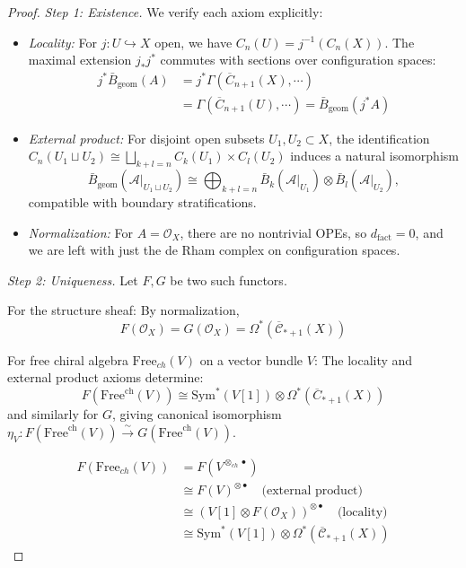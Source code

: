 \begin{proof}
\emph{Step 1: Existence.} We verify each axiom explicitly:
\begin{itemize}
\item \emph{Locality:} For $j: U \hookrightarrow X$ open,
we have $C_n(U) = j^{-1}(C_n(X))$.
The maximal extension $j_*j^*$ commutes with sections over
configuration spaces:
\begin{align*}
j^*\bar{B}_{\text{geom}}(A)
&= j^*\Gamma(\overline{C}_{n+1}(X), \cdots) \\
&= \Gamma(\overline{C}_{n+1}(U), \cdots)
= \bar{B}_{\text{geom}}(j^*A)
\end{align*}

\item \emph{External product:} For disjoint open subsets
$U_1, U_2 \subset X$, the identification
$C_n(U_1 \sqcup U_2) \cong
\bigsqcup_{k+l=n} C_k(U_1) \times C_l(U_2)$
induces a natural isomorphism
\[
\bar{B}_{\mathrm{geom}}(\mathcal{A}|_{U_1 \sqcup U_2})
\cong \bigoplus_{k+l=n}
\bar{B}_k(\mathcal{A}|_{U_1}) \otimes
\bar{B}_l(\mathcal{A}|_{U_2}),
\]
compatible with boundary stratifications.

\item \emph{Normalization:} For $A = \mathcal{O}_X$, there are no nontrivial OPEs, so 
$d_{\text{fact}} = 0$, and we are left with just the de Rham complex on configuration spaces.
\end{itemize}

\emph{Step 2: Uniqueness.} Let $F, G$ be two such functors. 

For the structure sheaf: By normalization, 
\[F(\mathcal{O}_X) = G(\mathcal{O}_X) = \Omega^*(\overline{\mathcal{C}}_{*+1}(X))\]

For free chiral algebra $\text{Free}_{ch}(V)$ on a vector bundle $V$:
The locality and external product axioms determine:
\[F(\text{Free}^{\text{ch}}(V)) \cong \text{Sym}^*(V[1]) \otimes \Omega^*(\overline{C}_{*+1}(X))\]
and similarly for $G$, giving canonical isomorphism $\eta_V: F(\text{Free}^{\text{ch}}(V)) \xrightarrow{\sim} G(\text{Free}^{\text{ch}}(V))$.


\begin{align}
F(\text{Free}_{ch}(V)) &= F(V^{\otimes_{ch} \bullet})\\
&\cong F(V)^{\otimes \bullet} \quad \text{(external product)}\\
&\cong (V[1] \otimes F(\mathcal{O}_X))^{\otimes \bullet} \quad \text{(locality)}\\
&\cong \text{Sym}^*(V[1]) \otimes \Omega^*(\overline{\mathcal{C}}_{*+1}(X))
\end{align}


\end{proof}
